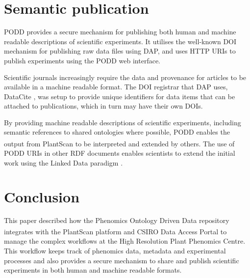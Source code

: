 \documentclass{llncs}
\begin{document}
\section{Semantic publication}
PODD provides a secure mechanism for publishing both human and machine readable
descriptions of scientific experiments. It utilises the well-known DOI mechanism
for publishing raw data files using DAP, and uses HTTP URIs to publish
experiments using the PODD web interface.




Scientific journals increasingly require the data and provenance for articles to
be available in a machine readable format. The DOI registrar that DAP uses,
DataCite \cite{Brase2009}, was setup to provide unique identifiers for data
items that can
be attached to publications, which in turn may have their own DOIs.


By providing machine readable descriptions of scientific experiments, including
semantic references to shared ontologies where possible, PODD enables the output
from PlantScan\textsuperscript{\texttrademark} to be interpreted and extended by
others. The use of PODD URIs
in other RDF documents enables scientists to extend the initial work using the
Linked Data paradigm \cite{BernersLee}.


\section{Conclusion}
This paper described how the Phenomics Ontology Driven Data repository
integrates with the PlantScan\textsuperscript{\texttrademark} platform and CSIRO
Data Access Portal to manage
the complex workflows at the High Resolution Plant Phenomics Centre. This
workflow keeps track of phenomics data, metadata and experimental processes and
also provides a secure mechanism to share and publish scientific experiments in
both human and machine readable formats.




\end{document}
